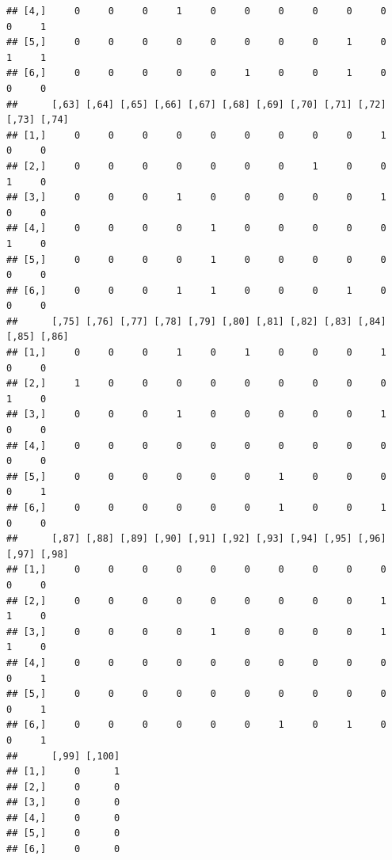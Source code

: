 \documentclass[
]{book}
\newenvironment{Shaded}{\begin{snugshade}}{\end{snugshade}}
\newcommand{\FunctionTok}[1]{\textcolor[rgb]{0.13,0.29,0.53}{\textbf{#1}}}
\newcommand{\NormalTok}[1]{#1}
\newcommand{\OtherTok}[1]{\textcolor[rgb]{0.56,0.35,0.01}{#1}}
\newcommand{\SpecialCharTok}[1]{\textcolor[rgb]{0.81,0.36,0.00}{\textbf{#1}}}
\theoremstyle{definition}
\theoremstyle{definition}
\theoremstyle{definition}
\theoremstyle{definition}
\theoremstyle{remark}
\begin{document}
\begin{verbatim}
## [4,]     0     0     0     1     0     0     0     0     0     0     0     1
## [5,]     0     0     0     0     0     0     0     0     1     0     1     1
## [6,]     0     0     0     0     0     1     0     0     1     0     0     0
##      [,63] [,64] [,65] [,66] [,67] [,68] [,69] [,70] [,71] [,72] [,73] [,74]
## [1,]     0     0     0     0     0     0     0     0     0     1     0     0
## [2,]     0     0     0     0     0     0     0     1     0     0     1     0
## [3,]     0     0     0     1     0     0     0     0     0     1     0     0
## [4,]     0     0     0     0     1     0     0     0     0     0     1     0
## [5,]     0     0     0     0     1     0     0     0     0     0     0     0
## [6,]     0     0     0     1     1     0     0     0     1     0     0     0
##      [,75] [,76] [,77] [,78] [,79] [,80] [,81] [,82] [,83] [,84] [,85] [,86]
## [1,]     0     0     0     1     0     1     0     0     0     1     0     0
## [2,]     1     0     0     0     0     0     0     0     0     0     1     0
## [3,]     0     0     0     1     0     0     0     0     0     1     0     0
## [4,]     0     0     0     0     0     0     0     0     0     0     0     0
## [5,]     0     0     0     0     0     0     1     0     0     0     0     1
## [6,]     0     0     0     0     0     0     1     0     0     1     0     0
##      [,87] [,88] [,89] [,90] [,91] [,92] [,93] [,94] [,95] [,96] [,97] [,98]
## [1,]     0     0     0     0     0     0     0     0     0     0     0     0
## [2,]     0     0     0     0     0     0     0     0     0     1     1     0
## [3,]     0     0     0     0     1     0     0     0     0     1     1     0
## [4,]     0     0     0     0     0     0     0     0     0     0     0     1
## [5,]     0     0     0     0     0     0     0     0     0     0     0     1
## [6,]     0     0     0     0     0     0     1     0     1     0     0     1
##      [,99] [,100]
## [1,]     0      1
## [2,]     0      0
## [3,]     0      0
## [4,]     0      0
## [5,]     0      0
## [6,]     0      0
\end{verbatim}

\begin{Shaded}
\end{Shaded}
\end{document}
